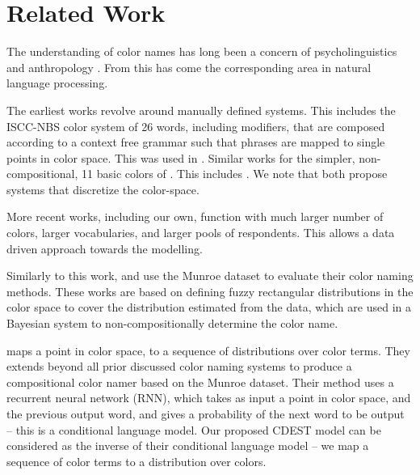 \documentclass[11pt,a4paper]{article}
\newcommand{\parencite}{\citep}
\newcommand{\textcite}{\cite}
\begin{document}
\section{Related Work}\label{sec:related-work}
The understanding of color names has long been a concern of psycholinguistics and anthropology  \parencite{berlin1969basic,heider1972universals,HEIDER1972337,mylonas2015use}.
From this has come the corresponding area in natural language processing.

The earliest works revolve around manually defined systems.
This includes the ISCC-NBS color system \parencite{kelly1955iscc} of 26 words, including modifiers, that are composed according to a context free grammar such that phrases are mapped to single points in color space.
This was used in \textcite{Berk:1982:HFS:358589.358606, conway1992experimental, mojsilovic2005computational}.
Similar works for the simpler, non-compositional, 11 basic colors of \textcite{berlin1969basic}.
This includes \textcite{ele1994computational,menegaz2007discrete,van2009learning}.
We note that \textcite{menegaz2007discrete,van2009learning} both propose systems that discretize the color-space.


More recent works, including our own, function with much larger number of colors, larger vocabularies, and larger pools of respondents.
This allows a data driven approach towards the modelling.

Similarly to this work, \textcite{mcmahan2015bayesian} and \textcite{meomcmahanstone:color} use the Munroe dataset to evaluate their color naming methods.
These works are based on defining fuzzy rectangular distributions in the color space to cover the distribution estimated from the data, which are used in a Bayesian system to non-compositionally determine the color name.


\textcite{2016arXiv160603821M} maps a point in color space, to a sequence of distributions over color terms.
They extends beyond all prior discussed color naming systems to produce a compositional color namer based on the Munroe dataset.
Their method uses a recurrent neural network (RNN), which takes as input a point in color space, and the previous output word, and gives a probability of the next word to be output -- this is a conditional language model.
Our proposed CDEST model can be considered as the inverse of their conditional language model -- we map a sequence of color terms to a distribution over colors.
\end{document}
